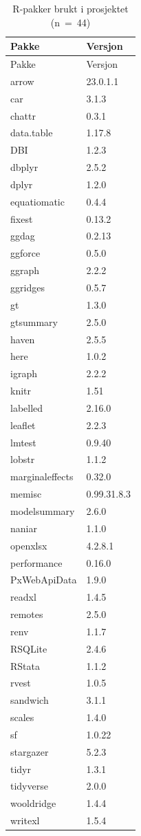 \documentclass[
  norsk,
  letterpaper,
  DIV=11,
  numbers=noendperiod]{scrreprt}
\theoremstyle{definition}
\theoremstyle{remark}
\begin{document}
\begin{longtable}[]{@{}ll@{}}
\caption{R-pakker brukt i prosjektet (n~=~44)}\tabularnewline
\toprule\noalign{}
Pakke & Versjon \\
\midrule\noalign{}
\endfirsthead
\toprule\noalign{}
Pakke & Versjon \\
\midrule\noalign{}
\endhead
\bottomrule\noalign{}
\endlastfoot
arrow & 23.0.1.1 \\
car & 3.1.3 \\
chattr & 0.3.1 \\
data.table & 1.17.8 \\
DBI & 1.2.3 \\
dbplyr & 2.5.2 \\
dplyr & 1.2.0 \\
equatiomatic & 0.4.4 \\
fixest & 0.13.2 \\
ggdag & 0.2.13 \\
ggforce & 0.5.0 \\
ggraph & 2.2.2 \\
ggridges & 0.5.7 \\
gt & 1.3.0 \\
gtsummary & 2.5.0 \\
haven & 2.5.5 \\
here & 1.0.2 \\
igraph & 2.2.2 \\
knitr & 1.51 \\
labelled & 2.16.0 \\
leaflet & 2.2.3 \\
lmtest & 0.9.40 \\
lobstr & 1.1.2 \\
marginaleffects & 0.32.0 \\
memisc & 0.99.31.8.3 \\
modelsummary & 2.6.0 \\
naniar & 1.1.0 \\
openxlsx & 4.2.8.1 \\
performance & 0.16.0 \\
PxWebApiData & 1.9.0 \\
readxl & 1.4.5 \\
remotes & 2.5.0 \\
renv & 1.1.7 \\
RSQLite & 2.4.6 \\
RStata & 1.1.2 \\
rvest & 1.0.5 \\
sandwich & 3.1.1 \\
scales & 1.4.0 \\
sf & 1.0.22 \\
stargazer & 5.2.3 \\
tidyr & 1.3.1 \\
tidyverse & 2.0.0 \\
wooldridge & 1.4.4 \\
writexl & 1.5.4 \\
\end{longtable}
\end{document}
